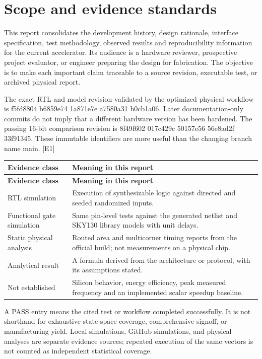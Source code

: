 \documentclass[10pt,letterpaper]{article}
\begin{document}
\clearpage
\section{Scope and evidence standards}
This report consolidates the development history, design rationale, interface specification, test methodology, observed results and reproducibility information for the current accelerator. Its audience is a hardware reviewer, prospective project evaluator, or engineer preparing the design for fabrication. The objective is to make each important claim traceable to a source revision, executable test, or archived physical report.

The exact RTL and model revision validated by the optimized physical workflow is f5fd8804 b6859e74 1a871e7e a7580a31 b0cb1a06. Later documentation-only commits do not imply that a different hardware version has been hardened. The passing 16-bit comparison revision is 8f49f602 017c429c 50157e56 56e8ad2f 33f91345. These immutable identifiers are more useful than the changing branch name main. [E1]

{\small\begin{longtable}{>{\raggedright\arraybackslash}p{0.250000\dimexpr\linewidth-4\tabcolsep\relax}>{\raggedright\arraybackslash}p{0.750000\dimexpr\linewidth-4\tabcolsep\relax}}\toprule
\textbf{Evidence class} & \textbf{Meaning in this report}\\\midrule\endfirsthead\textbf{Evidence class} & \textbf{Meaning in this report}\\\midrule\endhead
RTL simulation & Execution of synthesizable logic against directed and seeded randomized inputs.\\
Functional gate simulation & Same pin-level tests against the generated netlist and SKY130 library models with unit delays.\\
Static physical analysis & Routed area and multicorner timing reports from the official build; not measurements on a physical chip.\\
Analytical result & A formula derived from the architecture or protocol, with its assumptions stated.\\
Not established & Silicon behavior, energy efficiency, peak measured frequency and an implemented scalar speedup baseline.\\
\bottomrule\end{longtable}}
A PASS entry means the cited test or workflow completed successfully. It is not shorthand for exhaustive state-space coverage, comprehensive signoff, or manufacturing yield. Local simulations, GitHub simulations, and physical analyses are separate evidence sources; repeated execution of the same vectors is not counted as independent statistical coverage.
\end{document}
